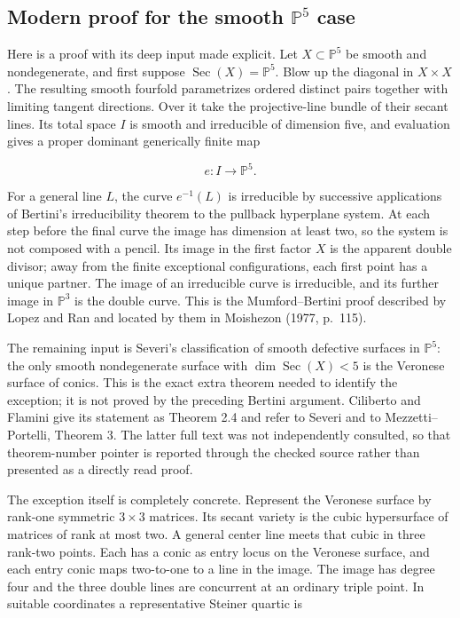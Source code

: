 \subsection[Modern proof in projective five-space]{Modern proof for the smooth \(\mathbb P^5\) case}

Here is a proof with its deep input made explicit. Let \(X\subset\mathbb P^5\) be smooth and nondegenerate, and first suppose \(\operatorname{Sec}(X)=\mathbb P^5\). Blow up the diagonal in \(X\times X\). The resulting smooth fourfold parametrizes ordered distinct pairs together with limiting tangent directions. Over it take the projective-line bundle of their secant lines. Its total space \(I\) is smooth and irreducible of dimension five, and evaluation gives a proper dominant generically finite map

\[
e:I\longrightarrow\mathbb P^5.
\]

For a general line \(L\), the curve \(e^{-1}(L)\) is irreducible by successive applications of Bertini's irreducibility theorem to the pullback hyperplane system. At each step before the final curve the image has dimension at least two, so the system is not composed with a pencil. Its image in the first factor \(X\) is the apparent double divisor; away from the finite exceptional configurations, each first point has a unique partner. The image of an irreducible curve is irreducible, and its further image in \(\mathbb P^3\) is the double curve. This is the Mumford--Bertini proof described by Lopez and Ran and located by them in Moishezon (1977, p.~115).

The remaining input is Severi's classification of smooth defective surfaces in \(\mathbb P^5\): the only smooth nondegenerate surface with \(\dim\operatorname{Sec}(X)<5\) is the Veronese surface of conics. This is the exact extra theorem needed to identify the exception; it is not proved by the preceding Bertini argument. Ciliberto and Flamini give its statement as Theorem 2.4 and refer to Severi and to Mezzetti--Portelli, Theorem 3. The latter full text was not independently consulted, so that theorem-number pointer is reported through the checked source rather than presented as a directly read proof.

The exception itself is completely concrete. Represent the Veronese surface by rank-one symmetric \(3\times3\) matrices. Its secant variety is the cubic hypersurface of matrices of rank at most two. A general center line meets that cubic in three rank-two points. Each has a conic as entry locus on the Veronese surface, and each entry conic maps two-to-one to a line in the image. The image has degree four and the three double lines are concurrent at an ordinary triple point. In suitable coordinates a representative Steiner quartic is

